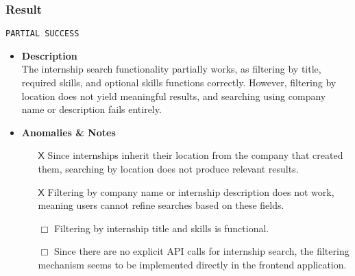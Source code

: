 \subsubsection{Result}
\verb|PARTIAL SUCCESS|
\begin{itemize}
    \item \textbf{\color{titleColor} Description}\\
    The internship search functionality partially works, as filtering by title, required skills, and optional skills functions correctly. However, filtering by location does not yield meaningful results, and searching using company name or description fails entirely.
    \item \textbf{\color{titleColor} Anomalies \& Notes}
    \begin{itemize}
            \item [{\color{titleColor}\(\mathsf{X}\)}] Since internships inherit their location from the company that created them, searching by location does not produce relevant results.
            \item [{\color{titleColor}\(\mathsf{X}\)}] Filtering by company name or internship description does not work, meaning users cannot refine searches based on these fields.
            \item [{\color{titleColor}\(\Box \)}]  Filtering by internship title and skills is functional.
            \item [{\color{titleColor}\(\Box \)}]  Since there are no explicit API calls for internship search, the filtering mechanism seems to be implemented directly in the frontend application.
        \end{itemize} 
\end{itemize}
